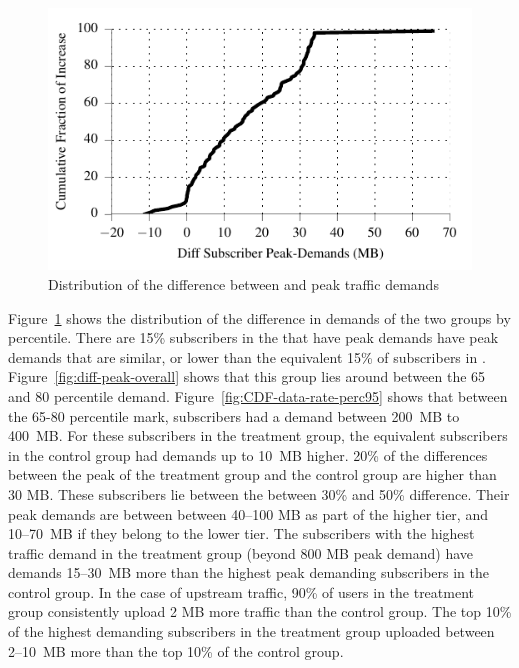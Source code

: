 \begin{figure}[t]
\centering
\includegraphics[width=.5\linewidth]{figures/cdf_diff_perc95_bytes_subsc-overall.pdf}
               \caption{Distribution of the difference between \treatment{} and \control{}
               peak traffic demands\label{fig:cdf-diff-perc95}}
\end{figure}

Figure~\ref{fig:cdf-diff-perc95} shows the distribution of the
difference in demands of the two groups by percentile. There are 15\%
subscribers in the \treatment{} that have peak demands have peak demands
that are similar, or lower than the equivalent 15\% of subscribers in
\control{}. Figure~\ref{fig:diff-peak-overall} shows that this group
lies around between the 65 and 80 percentile
demand. Figure~\ref{fig:CDF-data-rate-perc95} shows that between the
65-80 percentile mark, subscribers had a demand between 200~MB to
400~MB. For these subscribers in the treatment group, the equivalent
subscribers in the control group had demands up to 10~MB higher. 20\% of the
differences between the peak of the treatment group and the control
group are higher than 30 MB. These subscribers lie between the between
30\% and 50\% difference. Their peak demands are between between 40--100
MB as part of the higher tier, and 10--70~MB if they belong to the lower
tier.  The subscribers with the highest traffic demand in the treatment
group (beyond 800 MB peak demand) have demands 15--30~MB more than the
highest peak demanding subscribers in the control group.  In the case of
upstream traffic, 90\% of users in the treatment group consistently
upload 2 MB more traffic than the control group. The top 10\% of the
highest demanding subscribers in the treatment group uploaded between 2--10~MB
more than the top 10\% of the control group.
\fi

